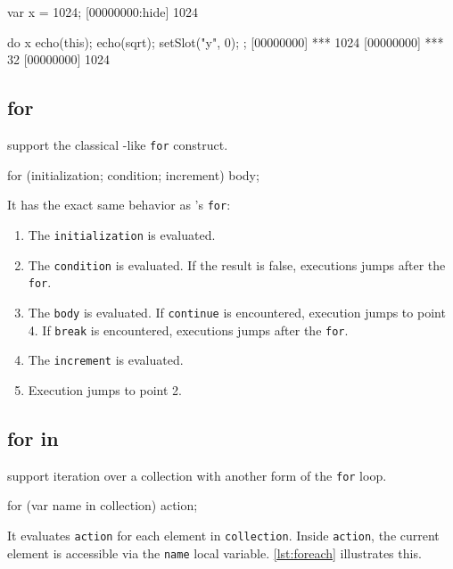 \begin{urbiscript}[caption=Using \lstinline|do|, label=lst:do,
  float=\floatpos]
var x = 1024;
[00000000:hide] 1024

do x
{
  echo(this);
  echo(sqrt);
  setSlot("y", 0);
};
[00000000] *** 1024
[00000000] *** 32
[00000000] 1024
\end{urbiscript}

\subsection{for}

\us support the classical \C-like \lstinline|for| construct.

\begin{urbiscript}[frame=, backgroundcolor=, ]
for (initialization; condition; increment)
  body;
\end{urbiscript}

It has the exact same behavior as \C's \lstinline|for|:

\begin{enumerate}
\item The \lstinline|initialization| is evaluated.
\item The \lstinline|condition| is evaluated. If the result is false,
  executions jumps after the \lstinline|for|.
\item The \lstinline|body| is evaluated. If \lstinline|continue| is
  encountered, execution jumps to point 4. If \lstinline|break| is
  encountered, executions jumps after the \lstinline|for|.
\item The \lstinline|increment| is evaluated.
\item Execution jumps to point 2.
\end{enumerate}

\subsection{for in}

\us support iteration over a collection with another form of the
\lstinline|for| loop.

\begin{urbiscript}[frame=, backgroundcolor=, ]
for (var name in collection)
  action;
\end{urbiscript}

It evaluates \lstinline|action| for each element in
\lstinline|collection|. Inside \lstinline|action|, the current element
is accessible via the \lstinline|name| local variable. \autoref{lst:foreach}
illustrates this.



